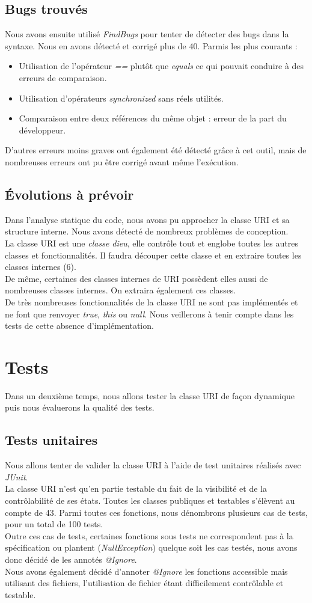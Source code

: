 \documentclass[a4paper,11pt]{article}
\newcommand{\br}{\\\mbox{}}
\begin{document}
\subsection{Bugs trouvés}
Nous avons ensuite utilisé \textit{FindBugs} pour tenter de détecter des bugs dans la syntaxe. Nous en avons détecté et corrigé plus de 40.
Parmis les plus courants : 
\begin{itemize}
\item Utilisation de l'opérateur \textit{==} plutôt que \textit{equals} ce qui pouvait conduire à des erreurs de comparaison.
\item Utilisation d'opérateurs \textit{synchronized} sans réels utilités.
\item Comparaison entre deux références du même objet : erreur de la part du développeur.
\end{itemize}
D'autres erreurs moins graves ont également été détecté grâce à cet outil, mais de nombreuses erreurs ont pu être corrigé avant même l'exécution.
\subsection{Évolutions à prévoir}
Dans l'analyse statique du code, nous avons pu approcher la classe URI et sa structure interne. Nous avons détecté de nombreux problèmes de conception.\br
La classe URI est une \textit{classe dieu}, elle contrôle tout et englobe toutes les autres classes et fonctionnalités. Il faudra découper cette classe et en extraire toutes les classes internes (6).\br
De même, certaines des classes internes de URI possèdent elles aussi de nombreuses classes internes. On extraira également ces classes.\br
De très nombreuses fonctionnalités de la classe URI ne sont pas implémentés et ne font que renvoyer \textit{true}, \textit{this} ou \textit{null}. Nous veillerons à tenir compte dans les tests de cette absence d'implémentation.
\section{Tests}
Dans un deuxième temps, nous allons tester la classe URI de façon dynamique puis nous évaluerons la qualité des tests.
\subsection{Tests unitaires}
Nous allons tenter de valider la classe URI à l'aide de test unitaires réalisés avec \textit{JUnit}.\br
La classe URI n'est qu'en partie testable du fait de la visibilité et de la contrôlabilité de ses états. Toutes les classes publiques et testables s'élèvent au compte de 43. Parmi toutes ces fonctions, nous dénombrons plusieurs cas de tests, pour un total de 100 tests.\br
Outre ces cas de tests, certaines fonctions sous tests ne correspondent pas à la spécification ou plantent (\textit{NullException}) quelque soit les cas testés, nous avons donc décidé de les annotés \textit{@Ignore}.\br
Nous avons également décidé d'annoter \textit{@Ignore} les fonctions accessible mais utilisant des fichiers, l'utilisation de fichier étant difficilement contrôlable et testable.
\end{document}

